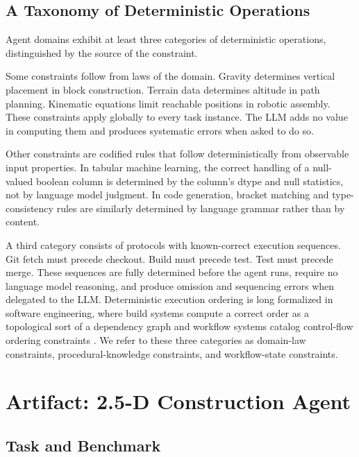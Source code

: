 \documentclass[10pt]{article}
\begin{document}
\subsection{A Taxonomy of Deterministic Operations}

Agent domains exhibit at least three categories of deterministic
operations, distinguished by the source of the constraint.

Some constraints follow from laws of the domain. Gravity determines
vertical placement in block construction. Terrain data determines
altitude in path planning. Kinematic equations limit reachable positions
in robotic assembly. These constraints apply globally to every task
instance. The LLM adds no value in computing them and produces systematic
errors when asked to do so.

Other constraints are codified rules that follow deterministically from
observable input properties. In tabular machine learning, the correct
handling of a null-valued boolean column is determined by the column's
dtype and null statistics, not by language model judgment. In code
generation, bracket matching and type-consistency rules are similarly
determined by language grammar rather than by content.

A third category consists of protocols with known-correct execution
sequences. Git fetch must precede checkout. Build must precede test. Test
must precede merge. These sequences are fully determined before the agent
runs, require no language model reasoning, and produce omission and
sequencing errors when delegated to the LLM. Deterministic execution
ordering is long formalized in software engineering, where build systems
compute a correct order as a topological sort of a dependency graph
\parencite{feldman1979} and workflow systems catalog
control-flow ordering constraints \parencite{aalst2003}.
We refer to these three categories as domain-law constraints,
procedural-knowledge constraints, and workflow-state constraints.

\section{Artifact: 2.5-D Construction Agent}

\subsection{Task and Benchmark}
\end{document}
